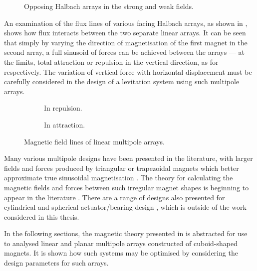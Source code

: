 \documentclass[11pt,a4paper]{memoir}
\begin{document}
\begin{figure}
   \centering
   \caption{Opposing Halbach arrays in the strong and weak fields.}
\end{figure}

An examination of the flux lines of various facing Halbach arrays, as shown in , shows how flux interacts between the two separate linear arrays.
It can be seen that simply by varying the direction of magnetisation of the first magnet in the second array, a full sinusoid of forces can be achieved between the arrays — at the limits, total
attraction or repulsion in the vertical direction, as for  respectively.
The variation of vertical force with horizontal displacement must be carefully considered in the design of a levitation system using such multipole arrays.

\begin{figure}
\begin{wide}
  \begin{subfigure}
  \texttt{[image: PhD/Figures/Multipole/2-halb-repl]}
  \caption{In repulsion.}
  \end{subfigure}\hfil
\begin{subfigure}
  \texttt{[image: PhD/Figures/Multipole/2-halb-attr]}
  \caption{In attraction.}
\end{subfigure}
\end{wide}
\caption{Magnetic field lines of linear multipole arrays.}
\end{figure}


Many various multipole designs have been presented in the literature, with larger fields and forces produced by triangular or trapezoidal magnets which better approximate true sinusoidal magnetisation \cite{cho2001,lee2006-mx,choi2008,meessen2008-ietm,marble2008-ietm}.
The theory for calculating the magnetic fields and forces between such irregular magnet shapes is beginning to appear in the literature \cite{janssen2009-ietm}.
There are a range of designs also presented for cylindrical and spherical actuator/bearing design
\cite{zhu2001-ipep,yan2006-iemx,xia2008-ietm}, which is outside of the work considered in this thesis.

In the following sections, the magnetic theory presented in  is abstracted for use to analysed linear and planar multipole arrays constructed of cuboid-shaped magnets.
It is shown how such systems may be optimised by considering the design parameters for such arrays.
\end{document}
